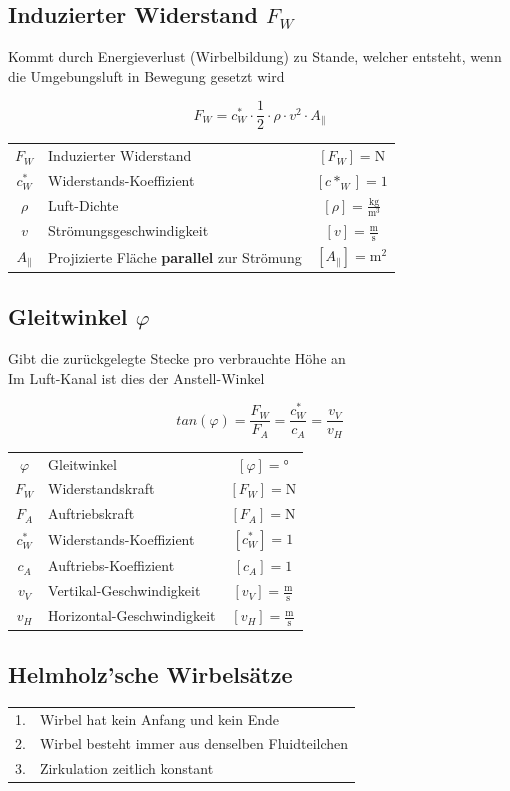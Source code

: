 \subsection{Induzierter Widerstand $F_W$}
Kommt durch Energieverlust (Wirbelbildung) zu Stande, welcher entsteht, wenn die Umgebungsluft in Bewegung gesetzt wird

$$ \boxed{ F_W = c^*_W \cdot \frac{1}{2} \cdot \rho \cdot v^2 \cdot A_{\|} } $$


\begin{tabular}{c l c}
		$F_W$ & Induzierter Widerstand & $[F_W] = \mathrm{N}$ \\
		$c^*_W$ & Widerstands-Koeffizient & $[c*_W] = 1$ \\
		\rule{0pt}{8pt}$\rho$ & Luft-Dichte & $[\rho] = \mathrm{\frac{kg}{m^3}}$ \\
		\rule{0pt}{8pt}$v$ & Strömungsgeschwindigkeit & $[v] = \mathrm{\frac{m}{s}}$ \\
		$A_{\|}$ & Projizierte Fläche \textbf{parallel} zur Strömung & $[A_{\|}] = \mathrm{m^2}$ \\
\end{tabular}




\subsection{Gleitwinkel $\varphi$}
Gibt die zurückgelegte Stecke pro verbrauchte Höhe an \\
Im Luft-Kanal ist dies der Anstell-Winkel

$$ \boxed{ tan(\varphi) = \frac{F_W}{F_A} = \frac{c^*_W}{c_A}= \frac{v_V}{v_H} }	$$


\begin{tabular}{c l c}
		$\varphi$ & Gleitwinkel & $[\varphi] = \text{°}$ \\
		$F_W$ & Widerstandskraft & $[F_W] = \mathrm{N}$ \\
		$F_A$ & Auftriebskraft & $[F_A] = \mathrm{N}$ \\ 
		$c^*_W$ & Widerstands-Koeffizient & $[c^*_W] = 1$ \\
		$c_A$ & Auftriebs-Koeffizient & $[c_A] = 1$ \\
		\rule{0pt}{8pt}$v_V$ & Vertikal-Geschwindigkeit & $[v_V] = \mathrm{\frac{m}{s}}$ \\
		\rule{0pt}{8pt}$v_H$ & Horizontal-Geschwindigkeit & $[v_H] = \mathrm{\frac{m}{s}}$ \\
\end{tabular}




\subsection{Helmholz'sche Wirbelsätze}
\begin{tabular}{ll}
1. & Wirbel hat kein Anfang und kein Ende \\
2. & Wirbel besteht immer aus denselben Fluidteilchen \\
3. & Zirkulation zeitlich konstant \\
\end{tabular}

\vfill\null
\columnbreak
